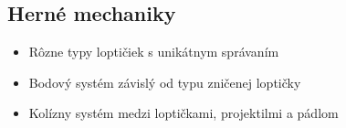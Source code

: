 \documentclass[12pt,a4paper]{article}
\begin{document}
\subsection{Herné mechaniky}
\begin{itemize}
    
    \item Rôzne typy loptičiek s unikátnym správaním
    \item Bodový systém závislý od typu zničenej loptičky
    \item Kolízny systém medzi loptičkami, projektilmi a pádlom
\end{itemize}
\end{document}
